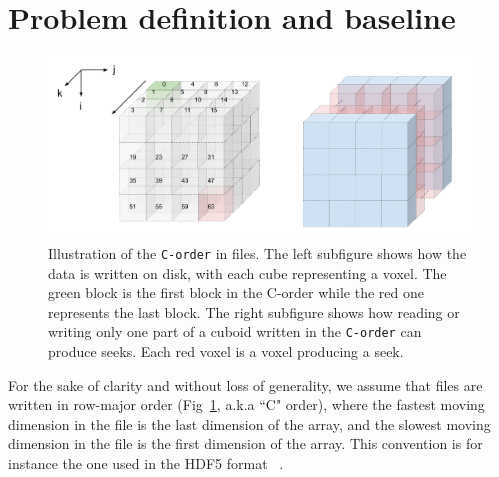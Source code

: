 \documentclass[sigconf, nonacm]{acmart}
\begin{document}



\section{Problem definition and baseline}
\begin{figure}[h]
  \centering
  \includegraphics[scale=0.35]{./figures/new/figure_1.png}
  \caption{Illustration of the \texttt{C-order} in files. The left subfigure
  shows how the data is written on disk, with each cube representing a voxel.
  The green block is the first block in the C-order while the red one represents the last block.
  The right subfigure shows how reading or writing only one part of a cuboid written
  in the \texttt{C-order} can produce seeks. Each red voxel is a voxel producing a seek.}
  \label{fig:seeks_and_rowmajor}
\end{figure}

For the sake of clarity and without loss of generality, we assume that
 files are written in row-major order (Fig~\ref{fig:seeks_and_rowmajor},
 a.k.a ``C" order), where the fastest moving dimension in the file is the
 last dimension of the array, and the slowest moving dimension in the file
 is the first dimension of the array. This convention is for instance the
 one used in the HDF5 format ~\cite{hdf5}. 
\end{document}
